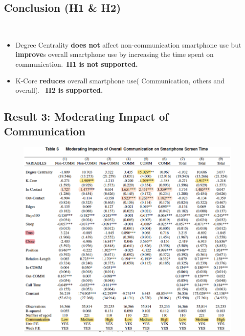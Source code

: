 \documentclass[
  letterpaper,
  DIV=11,
  numbers=noendperiod]{scrartcl}
\providecommand{\tightlist}{%
  \setlength{\itemsep}{0pt}\setlength{\parskip}{0pt}}\usepackage{longtable,booktabs,array}
\begin{document}
\hypertarget{conclusion-h1-h2}{%
\subsection{Conclusion (H1 \& H2)}\label{conclusion-h1-h2}}

~

\begin{itemize}
\tightlist
\item
  Degree Centrality \textbf{does not} affect non-communication
  smartphone use but \textbf{improve}s overall smartphone use by
  increasing the time spent on communication.~\textbf{H1 is not
  supported.}
\item
  K-Core \textbf{reduces} overall smartphone use( Communication, others
  and overall). ~\textbf{H2 is supported.}
\end{itemize}

\hypertarget{result-3-moderating-impact-of-communication}{%
\subsection{Result 3: Moderating Impact of
Communication}\label{result-3-moderating-impact-of-communication}}

\begin{figure}

{\centering \includegraphics{images/2table6.png}

}

\end{figure}
\end{document}
